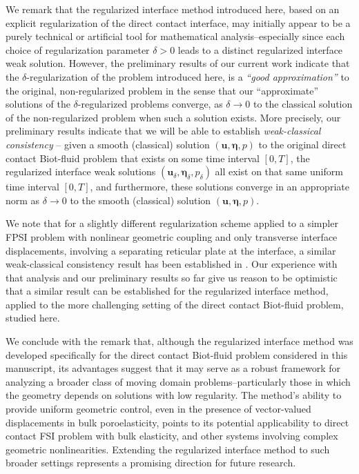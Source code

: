 \documentclass[11pt]{article}
\newcommand{\bd}{\boldsymbol}
\theoremstyle{definition}
\begin{document}
We remark that the regularized interface method introduced here, based on an explicit regularization of the direct contact interface,  may initially appear to be  a purely technical or artificial tool for mathematical analysis--especially since each choice of regularization parameter $\delta > 0$ leads to a distinct regularized interface weak solution.  However, the preliminary results of our current work indicate that the $\delta$-regularization of the problem introduced here, is a {\emph{``good approximation''}} to the original, non-regularized problem in the sense that our ``approximate'' solutions of the $\delta$-regularized problems converge, as $\delta \to 0$ to the classical solution of the non-regularized problem when such a solution exists. More precisely, our preliminary results indicate that we will be able to establish \textit{weak-classical consistency} -- given a smooth (classical) solution $(\bd{u}, \bd{\eta}, p)$ to the original direct contact Biot-fluid problem that exists on some time interval $[0, T]$, the regularized interface weak solutions  $(\bd{u}_{\delta}, \bd{\eta}_{\delta}, p_{\delta})$ all exist on that same uniform time interval $[0, T]$, and furthermore, these solutions converge in an appropriate norm as $\delta \to 0$ to the smooth (classical) solution $(\bd{u}, \bd{\eta}, p)$. 

We note that for a slightly different regularization scheme applied to a simpler FPSI problem with nonlinear geometric coupling and only transverse interface displacements, involving a separating reticular plate at the interface, a similar weak-classical consistency result has been established in \cite{FPSIJMPA}. Our experience with that analysis and our preliminary results so far  give us reason to be optimistic that a similar result can be established for the regularized interface method, applied to the more challenging setting of the direct contact Biot-fluid problem, studied here.

We conclude with the remark that, although the regularized interface method was developed specifically for the direct contact Biot-fluid problem considered in this manuscript, its advantages suggest that it may serve as a robust framework for analyzing a broader class of moving domain problems--particularly those in which the geometry depends on solutions with low regularity. The method's ability to provide uniform geometric control, even in the presence of vector-valued displacements in bulk poroelasticity, points to its potential applicability to direct contact FSI problem with bulk elasticity, and other systems involving complex geometric nonlinearities. Extending the regularized interface method to such broader settings represents a promising direction for future research.
\end{document}
